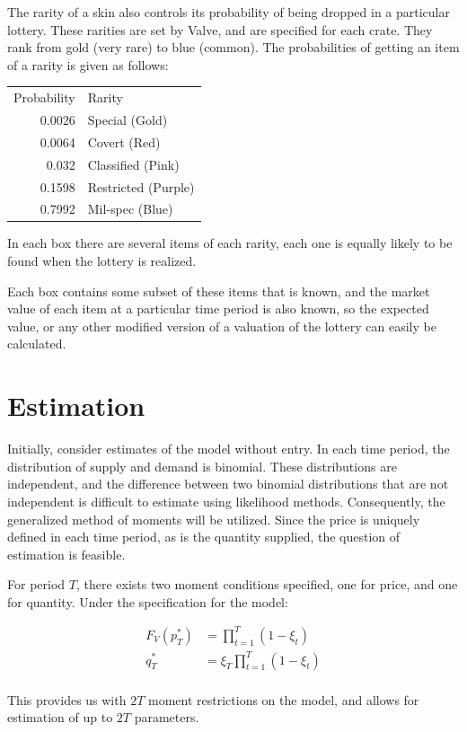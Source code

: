 \documentclass[12pt, letterpaper]{paper}
\begin{document}
The rarity of a skin also controls its probability of being
dropped in a particular lottery. These rarities are set by Valve, and
are specified for each crate. They rank from gold (very rare) to blue
(common). The probabilities of getting an item of a rarity is given as follows:
\begin{center}
\begin{tabular}{rl}
Probability & Rarity\\
0.0026 & Special (Gold)\\
0.0064 & Covert (Red)\\
0.032 & Classified (Pink)\\
0.1598 & Restricted (Purple)\\
0.7992 & Mil-spec (Blue)\\
\end{tabular}
\end{center}
In each box there are several items of each rarity, each one is
equally likely to be found when the lottery is realized.

Each box contains some subset of these items that is known, and the
market value of each item at a particular time period is also known,
so the expected value, or any other modified version of a valuation of
the lottery can easily be calculated.

\section{Estimation}
\label{sec-4}
Initially, consider estimates of the model without entry. In each time
period, the distribution of supply and demand is binomial. These
distributions are independent, and the difference between two binomial
distributions that are not independent is difficult to estimate using
likelihood methods. Consequently, the generalized method of moments
will be utilized. Since the price is uniquely defined in each time
period, as is the quantity supplied, the question of estimation is
feasible.

For period $T$, there exists two moment conditions specified,
one for price, and one for quantity. Under the specification for the
model:

\begin{align*}
F_V \left ( p_T^* \right ) &= \prod_{t=1}^T ( 1 - \xi_t )\\
q_T^* &= \xi_T \prod_{t=1}^T ( 1 - \xi_t )\\
\end{align*}

This provides us with $2T$ moment restrictions on the model, and allows
for estimation of up to $2T$ parameters.
\end{document}
